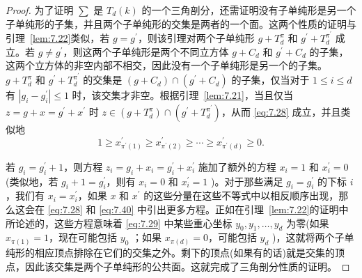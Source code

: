 \begin{proof}
为了证明 \(\sum\) 是 \({T}_{d}\left( k\right)\) 的一个三角剖分，还需证明没有子单纯形是另一个子单纯形的子集，并且两个子单纯形的交集是两者的一个面。这两个性质的证明与引理~\ref{lem:7.22}类似，若 \(g = {g}^{\prime }\)，则该引理对两个子单纯形 \(g + {T}_{d}^{\pi }\) 和 \({g}^{\prime } + {T}_{d}^{{\pi }^{\prime }}\) 成立。若 \(g \neq  {g}^{\prime }\)，则这两个子单纯形是两个不同立方体 \(g + {C}_{d}\) 和 \({g}^{\prime } + {C}_{d}\) 的子集，这两个立方体的非空内部不相交，因此没有一个子单纯形是另一个的子集。 \(g + {T}_{d}^{\pi }\) 和 \({g}^{\prime } + {T}_{d}^{{\pi }^{\prime }}\) 的交集是 \(\left( {g + {C}_{d}}\right)  \cap  \left( {{g}^{\prime } + {C}_{d}}\right)\) 的子集，仅当对于 \(1 \leq  i \leq  d\) 有 \(\left| {{g}_{i} - {g}_{i}^{\prime }}\right|  \leq  1\) 时，该交集才非空。根据引理~\ref{lem:7.21}，当且仅当 \(z = g + x = {g}^{\prime } + {x}^{\prime }\) 时 \(z \in  \left( {g + {T}_{d}^{\pi }}\right)  \cap  \left( {{g}^{\prime } + {T}_{d}^{{\pi }^{\prime }}}\right)\)，从而 \eqref{eq:7.28} 成立，并且类似地
\begin{equation}
1 \geq  {x}_{{\pi }^{\prime }\left( 1\right) }^{\prime } \geq  {x}_{{\pi }^{\prime }\left( 2\right) }^{\prime } \geq  \cdots  \geq  {x}_{{\pi }^{\prime }\left( d\right) }^{\prime } \geq  0.\label{eq:7.40}
\end{equation}

若 \({g}_{i} = {g}_{i}^{\prime } + 1\)，则方程 \({z}_{i} = {g}_{i} + {x}_{i} = {g}_{i}^{\prime } + {x}_{i}^{\prime }\) 施加了额外的方程 \({x}_{i} = 1\) 和 \({x}_{i}^{\prime } = 0\) (类似地，若 \({g}_{i} + 1 = {g}_{i}^{\prime }\)，则有 \({x}_{i} = 0\) 和 \({x}_{i}^{\prime } = 1\) )。对于那些满足 \({g}_{i} = {g}_{i}^{\prime }\) 的下标 \(i\)，我们有 \({x}_{i} = {x}_{i}^{\prime }\)，如果 \(x\) 和 \({x}^{\prime }\) 的这些分量在这些不等式中以相反顺序出现，那么这会在 \eqref{eq:7.28} 和 \eqref{eq:7.40} 中引出更多方程。正如在引理~\ref{lem:7.22}的证明中所论述的，这些方程意味着 \eqref{eq:7.29} 中某些重心坐标 \({y}_{0},{y}_{1},\ldots,{y}_{d}\) 为零(如果 \({x}_{\pi \left( 1\right) } = 1\)，现在可能包括 \({y}_{0}\) ；如果 \({x}_{\pi \left( d\right) } = 0\)，可能包括 \({y}_{d}\) )，这就将两个子单纯形的相应顶点排除在它们的交集之外。剩下的顶点(如果有的话)就是交集的顶点，因此该交集是两个子单纯形的公共面。这就完成了三角剖分性质的证明。
\end{proof}
\bigskip

